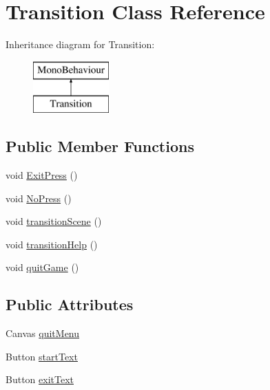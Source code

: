 \hypertarget{class_transition}{}\section{Transition Class Reference}
\label{class_transition}
Inheritance diagram for Transition\+:\begin{figure}[H]
\begin{center}
\leavevmode
\includegraphics[height=2.000000cm]{class_transition}
\end{center}
\end{figure}
\subsection*{Public Member Functions}
\begin{DoxyCompactItemize}
\item 
void \hyperlink{class_transition_acab716cbd4bcbd3da46e1161cd2a43e2}{Exit\+Press} ()
\item 
void \hyperlink{class_transition_a10c8060f16a9b5d09ce4524b9f8efa0f}{No\+Press} ()
\item 
void \hyperlink{class_transition_a6d5791afbbe63424104a41705c2aadfc}{transition\+Scene} ()
\item 
void \hyperlink{class_transition_a77fc2840187cd5d6b28430e307ccbe1e}{transition\+Help} ()
\item 
void \hyperlink{class_transition_ad49e89dfdf52c7cda9d0cbbe4639d6e6}{quit\+Game} ()
\end{DoxyCompactItemize}
\subsection*{Public Attributes}
\begin{DoxyCompactItemize}
\item 
Canvas \hyperlink{class_transition_ab609cd1ff603a1b4f70d1c485f791ddc}{quit\+Menu}
\item 
Button \hyperlink{class_transition_a4a6526330da3604fee707638f5ca9926}{start\+Text}
\item 
Button \hyperlink{class_transition_adb5a3c819a57321e4e06e92cb17fdf02}{exit\+Text}
\end{DoxyCompactItemize}


